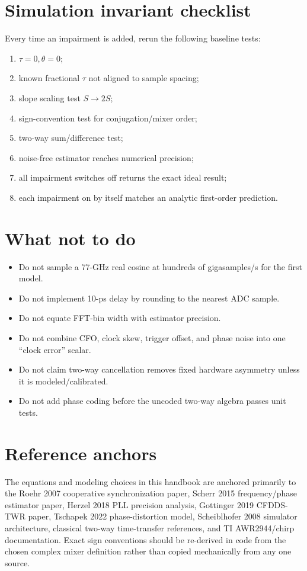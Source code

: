 \documentclass[11pt]{article}
\begin{document}
\section{Simulation invariant checklist}
Every time an impairment is added, rerun the following baseline tests:
\begin{enumerate}
\item $\tau=0,\theta=0$;
\item known fractional $\tau$ not aligned to sample spacing;
\item slope scaling test $S\rightarrow2S$;
\item sign-convention test for conjugation/mixer order;
\item two-way sum/difference test;
\item noise-free estimator reaches numerical precision;
\item all impairment switches off returns the exact ideal result;
\item each impairment on by itself matches an analytic first-order prediction.
\end{enumerate}

\section{What not to do}
\begin{itemize}
\item Do not sample a 77-GHz real cosine at hundreds of gigasamples/s for the first model.
\item Do not implement 10-ps delay by rounding to the nearest ADC sample.
\item Do not equate FFT-bin width with estimator precision.
\item Do not combine CFO, clock skew, trigger offset, and phase noise into one ``clock error'' scalar.
\item Do not claim two-way cancellation removes fixed hardware asymmetry unless it is modeled/calibrated.
\item Do not add phase coding before the uncoded two-way algebra passes unit tests.
\end{itemize}

\section{Reference anchors}
The equations and modeling choices in this handbook are anchored primarily to the Roehr 2007 cooperative synchronization paper, Scherr 2015 frequency/phase estimator paper, Herzel 2018 PLL precision analysis, Gottinger 2019 CFDDS-TWR paper, Tschapek 2022 phase-distortion model, Scheiblhofer 2008 simulator architecture, classical two-way time-transfer references, and TI AWR2944/chirp documentation. Exact sign conventions should be re-derived in code from the chosen complex mixer definition rather than copied mechanically from any one source.
\end{document}
